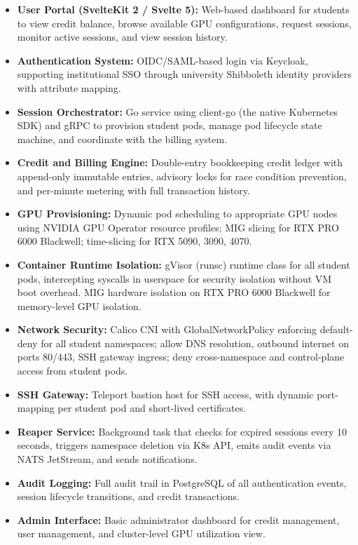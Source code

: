 \documentclass[12pt,a4paper]{article}
\begin{document}
\begin{itemize}[leftmargin=1.5em]
  \item \textbf{User Portal (SvelteKit 2 / Svelte 5):} Web-based dashboard for students to view credit balance, browse available GPU configurations, request sessions, monitor active sessions, and view session history.
  \item \textbf{Authentication System:} OIDC/SAML-based login via Keycloak, supporting institutional SSO through university Shibboleth identity providers with attribute mapping.
  \item \textbf{Session Orchestrator:} Go service using client-go (the native Kubernetes SDK) and gRPC to provision student pods, manage pod lifecycle state machine, and coordinate with the billing system.
  \item \textbf{Credit and Billing Engine:} Double-entry bookkeeping credit ledger with append-only immutable entries, advisory locks for race condition prevention, and per-minute metering with full transaction history.
  \item \textbf{GPU Provisioning:} Dynamic pod scheduling to appropriate GPU nodes using NVIDIA GPU Operator resource profiles; MIG slicing for RTX PRO 6000 Blackwell; time-slicing for RTX 5090, 3090, 4070.
  \item \textbf{Container Runtime Isolation:} gVisor (runsc) runtime class for all student pods, intercepting syscalls in userspace for security isolation without VM boot overhead. MIG hardware isolation on RTX PRO 6000 Blackwell for memory-level GPU isolation.
  \item \textbf{Network Security:} Calico CNI with GlobalNetworkPolicy enforcing default-deny for all student namespaces; allow DNS resolution, outbound internet on ports 80/443, SSH gateway ingress; deny cross-namespace and control-plane access from student pods.
  \item \textbf{SSH Gateway:} Teleport bastion host for SSH access, with dynamic port-mapping per student pod and short-lived certificates.
  \item \textbf{Reaper Service:} Background task that checks for expired sessions every 10 seconds, triggers namespace deletion via K8s API, emits audit events via NATS JetStream, and sends notifications.
  \item \textbf{Audit Logging:} Full audit trail in PostgreSQL of all authentication events, session lifecycle transitions, and credit transactions.
  \item \textbf{Admin Interface:} Basic administrator dashboard for credit management, user management, and cluster-level GPU utilization view.

\end{itemize}
\end{document}
